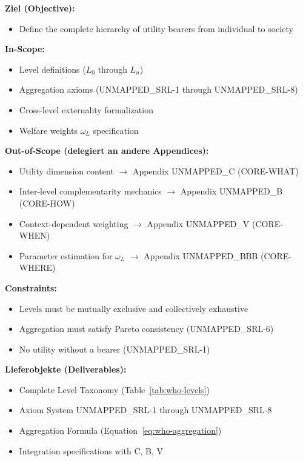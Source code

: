 
\begin{tcolorbox}[
    colback=orange!5!white,
    colframe=orange!75!black,
    title={\textbf{Appendix Scope: Ziel / In-Scope / Out-of-Scope / Constraints}},
    fonttitle=\bfseries
]

\textbf{Ziel (Objective):}
\begin{itemize}[nosep]
    \item Define the complete hierarchy of utility bearers from individual to society
\end{itemize}

\textbf{In-Scope:}
\begin{itemize}[nosep]
    \item Level definitions ($L_0$ through $L_n$)
    \item Aggregation axioms (UNMAPPED_SRL-1 through UNMAPPED_SRL-8)
    \item Cross-level externality formalization
    \item Welfare weights $\omega_L$ specification
\end{itemize}

\textbf{Out-of-Scope (delegiert an andere Appendices):}
\begin{itemize}[nosep]
    \item Utility dimension content $\rightarrow$ Appendix UNMAPPED_C (CORE-WHAT)
    \item Inter-level complementarity mechanics $\rightarrow$ Appendix UNMAPPED_B (CORE-HOW)
    \item Context-dependent weighting $\rightarrow$ Appendix UNMAPPED_V (CORE-WHEN)
    \item Parameter estimation for $\omega_L$ $\rightarrow$ Appendix UNMAPPED_BBB (CORE-WHERE)
\end{itemize}

\textbf{Constraints:}
\begin{itemize}[nosep]
    \item Levels must be mutually exclusive and collectively exhaustive
    \item Aggregation must satisfy Pareto consistency (UNMAPPED_SRL-6)
    \item No utility without a bearer (UNMAPPED_SRL-1)
\end{itemize}

\textbf{Lieferobjekte (Deliverables):}
\begin{itemize}[nosep]
    \item Complete Level Taxonomy (Table~\ref{tab:who-levels})
    \item Axiom System UNMAPPED_SRL-1 through UNMAPPED_SRL-8
    \item Aggregation Formula (Equation~\ref{eq:who-aggregation})
    \item Integration specifications with C, B, V
\end{itemize}

\end{tcolorbox}

